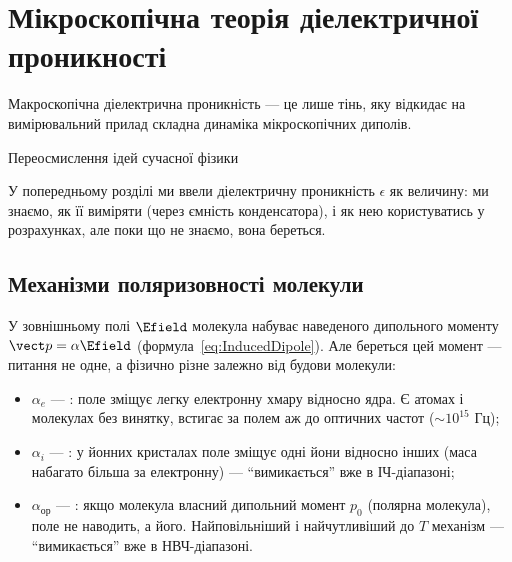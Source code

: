 
\chapter{Мікроскопічна теорія діелектричної проникності}\label{\currfilebase-II}
\graphicspath{{\currfilebase/Pictures}}
\epigraph{Макроскопічна діелектрична проникність --- це лише тінь, яку відкидає на вимірювальний прилад складна динаміка мікроскопічних диполів.
}{Переосмислення ідей сучасної фізики}

У попередньому розділі ми ввели діелектричну проникність $\epsilon$ як  величину: ми знаємо, як її виміряти (через ємність
конденсатора), і як нею користуватись у розрахунках, але поки що не знаємо,  вона береться.

\section{Механізми поляризовності молекули}\label{sec:AtomPolarizability}

У зовнішньому полі $\Efield$ молекула набуває наведеного дипольного моменту $\vect p = \alpha\Efield$ (формула~\eqref{eq:InducedDipole}). Але
 береться цей момент --- питання не одне, а фізично різне залежно від будови молекули:

\begin{itemize}
	\item $\alpha_e$ --- : поле зміщує легку електронну хмару відносно ядра. Є  атомах і молекулах без винятку,
	      встигає за полем аж до оптичних частот ($\sim10^{15}$ Гц);
	\item $\alpha_i$ --- : у йонних кристалах поле зміщує одні йони відносно інших (маса набагато більша за електронну) ---
	      \enquote{вимикається} вже в ІЧ-діапазоні;
	\item $\alpha_\text{ор}$ --- : якщо молекула  власний дипольний момент $p_0$ (полярна молекула), поле не
	      наводить, а  його. Найповільніший і найчутливіший до $T$ механізм --- \enquote{вимикається} вже в НВЧ-діапазоні.
\end{itemize}

